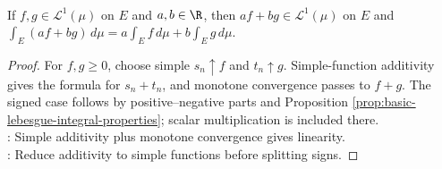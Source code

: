 \begin{proposition} \label{prop:lebesgue-integral-linearity} \\
If $f,g\in\mathscr{L}^1(\mu)$ on $E$ and $a,b\in\R$, then $af+bg\in\mathscr{L}^1(\mu)$ on $E$ and $\int_E(af+bg)\,d\mu=a\int_Ef\,d\mu+b\int_Eg\,d\mu$.
\begin{proof}
For $f,g\geq0$, choose simple $s_n\uparrow f$ and $t_n\uparrow g$. Simple-function additivity gives the formula for $s_n+t_n$, and monotone convergence passes to $f+g$. The signed case follows by positive--negative parts and Proposition \ref{prop:basic-lebesgue-integral-properties}; scalar multiplication is included there.\\
: Simple additivity plus monotone convergence gives linearity.\\
: Reduce additivity to simple functions before splitting signs.
\end{proof}
\end{proposition}

